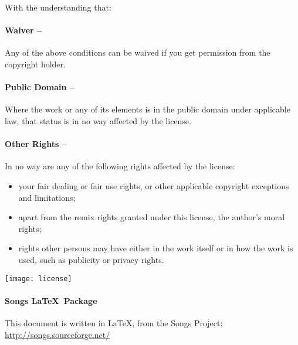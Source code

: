 \begin{lblock}{With the understanding that:}
  
  \hspace{0.4cm}
  \parbox{15cm}{
    \paragraph{Waiver --} 
    Any of the above conditions can be waived if you get permission 
    from the copyright holder.
        
    \paragraph{Public Domain --} 
    Where the work or any of its elements is in the public domain
    under applicable law, that status is in no way affected by the
    license.

    \paragraph{Other Rights --} 
    In no way are any of the following rights affected by the license:
    \begin{itemize}
    \item your fair dealing or fair use rights, or other applicable
      copyright exceptions and limitations;
    \item apart from the remix rights granted under this license, 
      the author's moral rights;
    \item rights other persons may have either in the work itself 
      or in how the work is used, such as publicity or privacy rights.
    \end{itemize}
  }
  
  \begin{center}
    \texttt{[image: license]}
  \end{center}

\end{lblock}
\paragraph{Songs \LaTeX~Package}
This document is written in \LaTeX, from the Songs Project:
\url{http://songs.sourceforge.net/}

